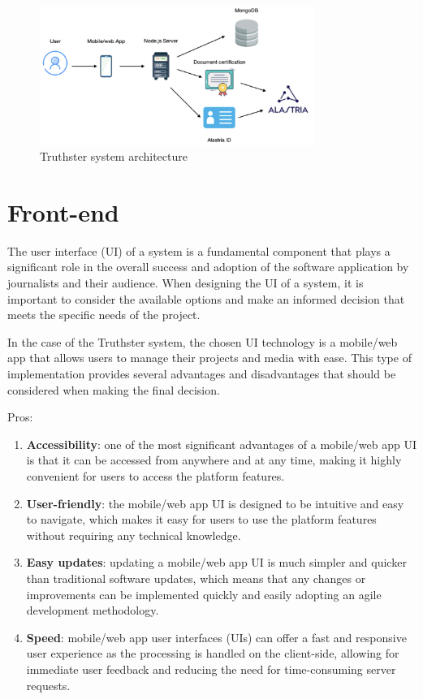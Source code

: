 \documentclass[target=mst,aauheader=]{thud}
\begin{document}
\begin{figure}
    \centering
    \includegraphics[width=0.8\textwidth]{images/technicalArchitectureStructuralView.png}
    \caption{Truthster system architecture}
    \label{fig:truthsterArchitecture}
\end{figure}


\section{Front-end}

The user interface (UI) of a system is a fundamental component that plays a significant role in the overall success and adoption of the software application by journalists and their audience. When designing the UI of a system, it is important to consider the available options and make an informed decision that meets the specific needs of the project.\par
In the case of the Truthster system, the chosen UI technology is a mobile/web app that allows users to manage their projects and media with ease. This type of implementation provides several advantages and disadvantages that should be considered when making the final decision.

Pros:

\begin{enumerate}

    \item \textbf{Accessibility}: one of the most significant advantages of a mobile/web app UI is that it can be accessed from anywhere and at any time, making it highly convenient for users to access the platform features.
    \item \textbf{User-friendly}: the mobile/web app UI is designed to be intuitive and easy to navigate, which makes it easy for users to use the platform features without requiring any technical knowledge.
    \item \textbf{Easy updates}: updating a mobile/web app UI is much simpler and quicker than traditional software updates, which means that any changes or improvements can be implemented quickly and easily adopting an agile development methodology.
    \item \textbf{Speed}: mobile/web app user interfaces (UIs) can offer a fast and responsive user experience as the processing is handled on the client-side, allowing for immediate user feedback and reducing the need for time-consuming server requests.

\end{enumerate}
\end{document}
